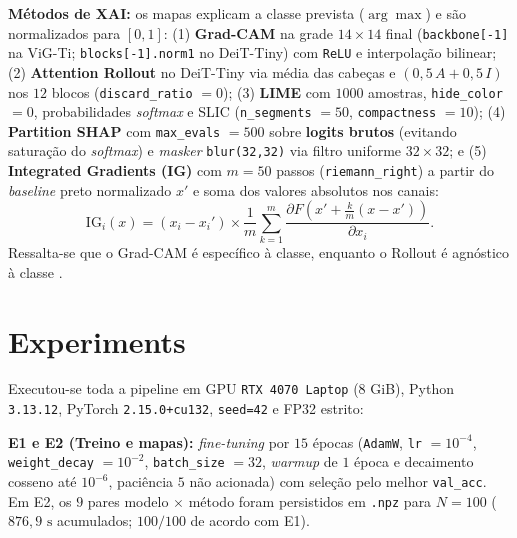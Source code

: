 \documentclass{article}
\begin{document}
\textbf{Métodos de XAI:} os mapas explicam a classe prevista ($\arg\max$) e são normalizados para $[0, 1]$: (1) \textbf{Grad-CAM} \citep{selvaraju2017gradcam,pope2019gnn} na grade $14 \times 14$ final (\texttt{backbone[-1]} na ViG-Ti; \texttt{blocks[-1].norm1} no DeiT-Tiny) com \texttt{ReLU} e interpolação bilinear; (2) \textbf{Attention Rollout} \citep{abnar2020rollout} no DeiT-Tiny via média das cabeças e $(0{,}5\,A + 0{,}5\,I)$ nos $12$ blocos (\texttt{discard\_ratio} $= 0$); (3) \textbf{LIME} \citep{ribeiro2016lime} com $1000$ amostras, \texttt{hide\_color} $= 0$, probabilidades \textit{softmax} e SLIC (\texttt{n\_segments} $= 50$, \texttt{compactness} $= 10$); (4) \textbf{Partition SHAP} \citep{lundberg2017shap} com \texttt{max\_evals} $= 500$ sobre \textbf{logits brutos} (evitando saturação do \textit{softmax}) e \textit{masker} \texttt{blur(32,32)} via filtro uniforme $32 \times 32$; e (5) \textbf{Integrated Gradients (IG)} \citep{sundararajan2017ig} com $m = 50$ passos (\texttt{riemann\_right}) a partir do \textit{baseline} preto normalizado $x'$ e soma dos valores absolutos nos canais:
\begin{equation}
    \mathrm{IG}_i(x) = (x_i - x_i') \times \frac{1}{m}\sum_{k=1}^{m} \frac{\partial F\left(x' + \frac{k}{m}(x - x')\right)}{\partial x_i}.
\end{equation}
Ressalta-se que o Grad-CAM é específico à classe, enquanto o Rollout é agnóstico à classe \citep{chefer2021transformer}.

\section{Experiments}
\label{sec:exp}

Executou-se toda a pipeline em GPU \texttt{RTX 4070 Laptop} (8 GiB), Python \texttt{3.13.12}, PyTorch \texttt{2.15.0+cu132}, \texttt{seed=42} e FP32 estrito:

\textbf{E1 e E2 (Treino e mapas):} \textit{fine-tuning} por $15$ épocas (\texttt{AdamW}, \texttt{lr} $= 10^{-4}$, \texttt{weight\_decay} $= 10^{-2}$, \texttt{batch\_size} $= 32$, \textit{warmup} de $1$ época e decaimento cosseno até $10^{-6}$, paciência $5$ não acionada) com seleção pelo melhor \texttt{val\_acc}. Em E2, os $9$ pares modelo $\times$ método foram persistidos em \texttt{.npz} para $N = 100$ ($876{,}9\text{ s}$ acumulados; $100/100$ de acordo com E1).
\end{document}
